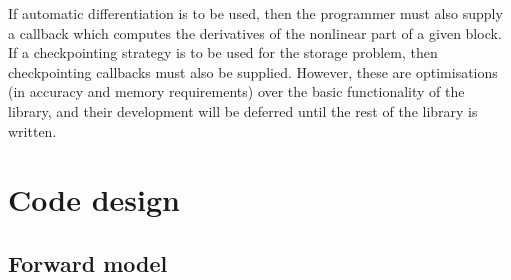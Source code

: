 \documentclass[10pt,authoryear]{elsarticle}
\begin{document}
If automatic differentiation is to be used, then the programmer must also supply a callback which computes the derivatives
of the nonlinear part of a given block. If a checkpointing strategy is to be used for the storage problem, then
checkpointing callbacks must also be supplied. However, these are optimisations (in accuracy and memory requirements)
over the basic functionality of the library, and their development will be deferred until the rest of the library
is written.

\section{Code design}
\subsection{Forward model}
\end{document}
